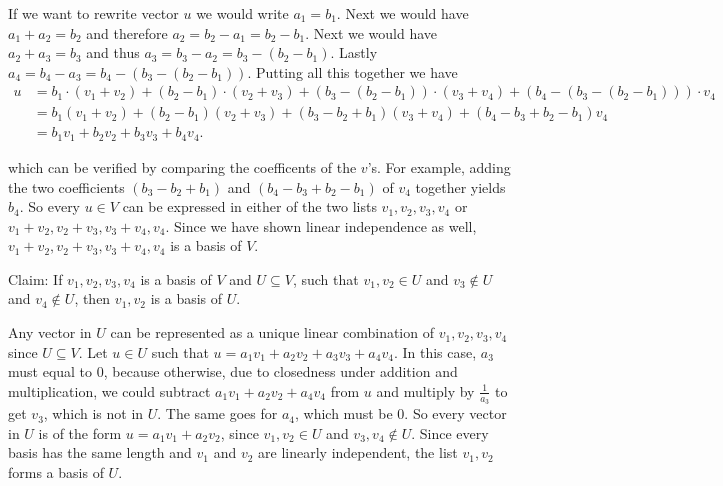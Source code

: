 \begin{xrcs}
\begin{prf}
    If we want to rewrite vector $u$ we would write $a_1 = b_1.$ Next we would have $a_1 + a_2 = b_2$ and therefore $a_2 = b_2 - a_1 = b_2-b_1$. Next we would have $a_2+a_3=b_3$ and thus $a_3= b_3-a_2 = b_3 - (b_2-b_1)$. Lastly $a_4 = b_4-a_3 = b_4-(b_3 - (b_2-b_1))$. Putting all this together we have
    \[
      \begin{aligned}
        u
        & = b_1 \cdot (v_1+v_2) + (b_2-b_1)\cdot(v_2+v_3) + (b_3 - (b_2-b_1)) \cdot (v_3 + v_4) + (b_4-(b_3 - (b_2-b_1))) \cdot v_4 \\
        & = b_1  (v_1+v_2) + (b_2-b_1)(v_2+v_3) + (b_3 - b_2+b_1)  (v_3 + v_4) + (b_4-b_3+b_2-b_1)  v_4 \\
        & = b_1 v_1 + b_2 v_2 + b_3 v_3 + b_4 v_4.
      \end{aligned}
    \]

    which can be verified by comparing the coefficents of the $v$'s. For example, adding the two coefficients $(b_3 - b_2+b_1)$ and $(b_4-b_3+b_2-b_1)$ of $v_4$ together yields $b_4$. So every $u \in V$ can be expressed in either of the two lists $v_1, v_2, v_3, v_4$ or $v_1 + v_2, v_2 + v_3, v_3+v_4, v_4$. Since we have shown linear independence as well, $v_1 + v_2, v_2 + v_3, v_3+v_4, v_4$ is a basis of $V$.
  \end{prf}
\end{xrcs}

\begin{xrcs}
  Claim: If $v_1, v_2, v_3, v_4$ is a basis of $V$ and $U \subseteq V$, such that $v_1, v_2 \in U$ and $v_3 \notin U$ and $v_4 \notin U$, then $v_1, v_2$ is a basis of $U$.
\end{xrcs}
\begin{prf}
  Any vector in $U$ can be represented as a unique linear combination of $v_1, v_2, v_3, v_4$ since $U \subseteq V$. Let $u\in U$ such that $u=a_1 v_1 + a_2 v_2 + a_3 v_3 + a_4 v_4$. In this case, $a_3$ must equal to $0$, because otherwise, due to closedness under addition and multiplication, we could subtract $a_1 v_1 + a_2 v_2+a_4v_4$ from $u$ and multiply by $\frac{1}{a_3}$ to get $v_3$, which is not in $U$. The same goes for $a_4$, which must be $0$. So every vector in $U$ is of the form $u=a_1 v_1 + a_2 v_2$, since $v_1, v_2 \in U$ and $v_3, v_4 \notin U$. Since every basis has the same length and $v_1$ and $v_2$ are linearly independent, the list $v_1, v_2$ forms a basis of $U$.
\end{prf}

